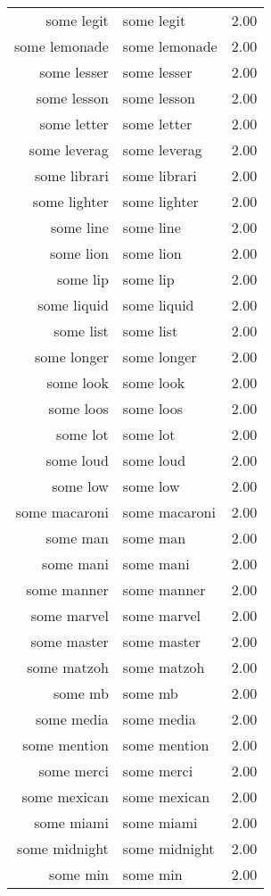 \begin{table}[ht]
\begin{tabular}{rlr}
  some legit & some legit & 2.00 \\ 
  some lemonade & some lemonade & 2.00 \\ 
  some lesser & some lesser & 2.00 \\ 
  some lesson & some lesson & 2.00 \\ 
  some letter & some letter & 2.00 \\ 
  some leverag & some leverag & 2.00 \\ 
  some librari & some librari & 2.00 \\ 
  some lighter & some lighter & 2.00 \\ 
  some line & some line & 2.00 \\ 
  some lion & some lion & 2.00 \\ 
  some lip & some lip & 2.00 \\ 
  some liquid & some liquid & 2.00 \\ 
  some list & some list & 2.00 \\ 
  some longer & some longer & 2.00 \\ 
  some look & some look & 2.00 \\ 
  some loos & some loos & 2.00 \\ 
  some lot & some lot & 2.00 \\ 
  some loud & some loud & 2.00 \\ 
  some low & some low & 2.00 \\ 
  some macaroni & some macaroni & 2.00 \\ 
  some man & some man & 2.00 \\ 
  some mani & some mani & 2.00 \\ 
  some manner & some manner & 2.00 \\ 
  some marvel & some marvel & 2.00 \\ 
  some master & some master & 2.00 \\ 
  some matzoh & some matzoh & 2.00 \\ 
  some mb & some mb & 2.00 \\ 
  some media & some media & 2.00 \\ 
  some mention & some mention & 2.00 \\ 
  some merci & some merci & 2.00 \\ 
  some mexican & some mexican & 2.00 \\ 
  some miami & some miami & 2.00 \\ 
  some midnight & some midnight & 2.00 \\ 
  some min & some min & 2.00 \\ 

\end{tabular}
\end{table}

